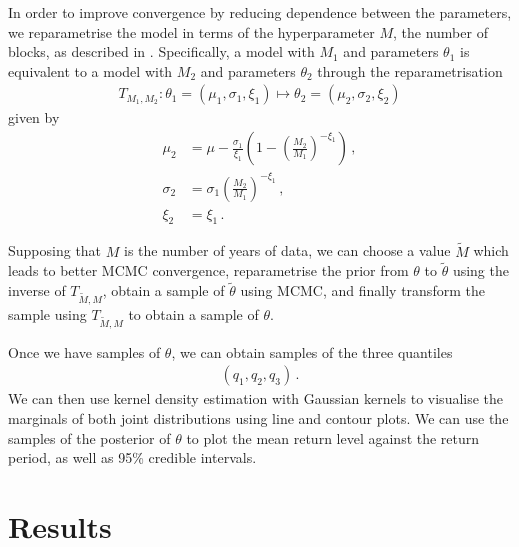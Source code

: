 \documentclass{article}
\begin{document}
%
In order to improve convergence
by reducing dependence between the parameters,
we reparametrise the model in terms of the hyperparameter $M$,
the number of blocks,
as described in \cite{sharkey2017}.
Specifically,
a model with $M_1$ and parameters $\theta_1$
is equivalent to a model with
$M_2$ and parameters $\theta_2$ through
the reparametrisation
%
\begin{align}
	T_{M_1, M_2} \colon \theta_1 = (\mu_1, \sigma_1, \xi_1)
		\mapsto \theta_2 = (\mu_2, \sigma_2, \xi_2)
	\label{eq:M-repara}
\end{align}
%
given by
%
\begin{align*}
	\mu_2 &= \mu - \frac{\sigma_1}{\xi_1}
		\left( 1 - \left(\frac{M_2}{M_1}\right) ^ {-\xi_1} \right)
		\,, \\
	\sigma_2 &= \sigma_1 \left(\frac{M_2}{M_1}\right) ^ {-\xi_1}
		\,, \\
	\xi_2 & = \xi_1 \,.
\end{align*}
%

%
Supposing that $M$ is the number of years of data,
we can choose a value $\tilde{M}$ which
leads to better MCMC convergence,
reparametrise the prior from 
$\theta$ to $\tilde{\theta}$
using the inverse of
$T_{\tilde{M}, M}$,
obtain a sample of $\tilde{\theta}$ using MCMC,
and finally transform the sample using $T_{\tilde{M}, M}$
to obtain a sample of $\theta$.

%
Once we have samples of $\theta$,
we can obtain samples of the three quantiles
%
\begin{align*}
	(q_1, q_2, q_3) \,.
\end{align*}
%
We can then use kernel density estimation
with Gaussian kernels to visualise the marginals of
both joint distributions
using line and contour plots.
We can use the samples of the posterior of $\theta$
to plot the mean return level against the return period,
as well as 95\% credible intervals.
%
\section{Results}
\label{section:studies}
%
\end{document}
